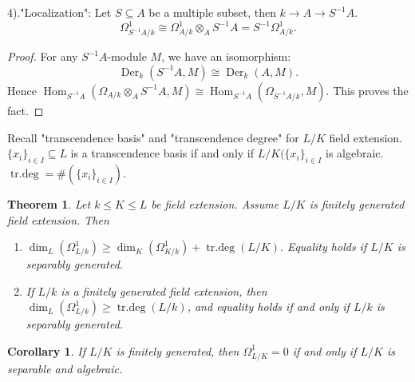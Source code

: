 \documentclass[cs4size]{article}
\newcommand{\su}{\subseteq}
\newcommand{\inv}{^{-1}}
\newcommand{\ra}{\rightarrow}
\DeclareMathOperator{\Der}{Der}
\DeclareMathOperator{\Hom}{Hom}
\DeclareMathOperator{\trdeg}{tr.deg}
\newtheorem{thm}{Theorem}
\newtheorem{cor}{Corollary}
\begin{document}
4)."Localization": Let $S\su A$ be a multiple subset, then $k\ra A\ra S\inv A$.
\[\Omega_{S\inv A/k}^1\cong \Omega_{A/k}^1\otimes_AS\inv A=S\inv \Omega_{A/k}^1.\]
\begin{proof}
For any $S\inv A$-module $M$, we have an isomorphism:
\[\Der_k(S\inv A,M)\cong\Der_k(A,M).\]
Hence $\Hom_{S\inv A}(\Omega_{A/k}\otimes_AS\inv A,M)\cong \Hom_{S\inv A}(\Omega_{S\inv A/k},M)$. This proves the fact.
\end{proof}

Recall "transcendence basis" and "transcendence degree" for $L/K$ field extension. $\{x_i\}_{i\in I}\su L$ is a transcendence basis if and only if $L/K(\{x_i\}_{i\in I}$ is algebraic. $\trdeg=\# (\{x_i\}_{i\in I})$.

\begin{thm}
Let $k\leq K\leq L$ be field extension. Assume $L/K$ is finitely generated field extension. Then
\begin{enumerate}
\item $\dim_L(\Omega_{L/k}^1)\geq \dim_K(\Omega_{K/k}^1)+\trdeg(L/K).$ Equality holds if $L/K$ is separably generated.
\item If $L/k$ is a finitely generated field extension, then $\dim_L(\Omega_{L/k}^1)\geq\trdeg(L/k)$, and equality holds if and only if $L/k$ is separably generated.
\end{enumerate}
\end{thm}
\begin{cor}
If $L/K$ is finitely generated, then $\Omega_{L/K}^1=0$ if and only if $L/K$ is separable and algebraic.
\end{cor}
\end{document}
